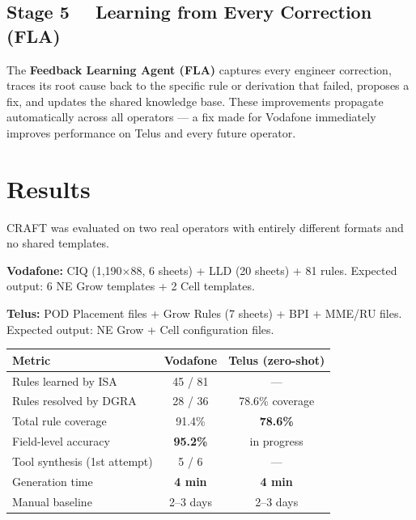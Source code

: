 \documentclass[10.5pt]{article}
\begin{document}
\subsection*{Stage 5 \ \ Learning from Every Correction (FLA)}

The \textbf{Feedback Learning Agent (FLA)} captures every engineer correction, traces its root cause back to the specific rule or derivation that failed, proposes a fix, and updates the shared knowledge base. These improvements propagate automatically across all operators --- a fix made for Vodafone immediately improves performance on Telus and every future operator.

\section{Results}

CRAFT was evaluated on two real operators with entirely different formats and no shared templates.

\textbf{Vodafone:} CIQ (1,190$\times$88, 6 sheets) + LLD (20 sheets) + 81 rules. Expected output: 6 NE Grow templates + 2 Cell templates.

\textbf{Telus:} POD Placement files + Grow Rules (7 sheets) + BPI + MME/RU files. Expected output: NE Grow + Cell configuration files.

\vspace{5pt}
\begin{center}
\renewcommand{\arraystretch}{1.4}
\begin{tabular}{lcc}
\toprule
\textbf{Metric} & \textbf{Vodafone} & \textbf{Telus (zero-shot)} \\
\midrule
Rules learned by ISA          & 45 / 81    & ---             \\
Rules resolved by DGRA        & 28 / 36    & 78.6\% coverage \\
Total rule coverage           & 91.4\%     & \textbf{78.6\%} \\
Field-level accuracy          & \textbf{95.2\%}  & in progress     \\
Tool synthesis (1st attempt)  & 5 / 6      & ---             \\
Generation time               & \textbf{4 min}   & \textbf{4 min}  \\
Manual baseline               & 2--3 days  & 2--3 days       \\
\bottomrule
\end{tabular}
\end{center}
\vspace{5pt}
\end{document}
